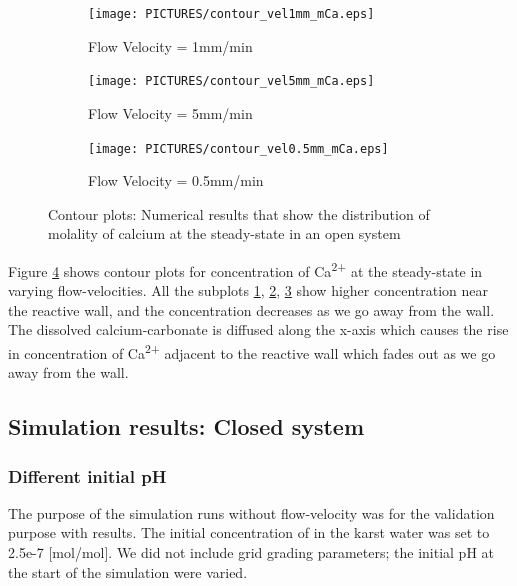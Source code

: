 \begin{figure}[!h]
\centering
    \begin{subfigure}{.5\linewidth}
        \centering
        \texttt{[image: PICTURES/contour\_vel1mm\_mCa.eps]}
        \caption{Flow Velocity = 1mm/min}
        \label{fig:CaSteady-state}       %
    \end{subfigure}%
    \hfill
    \begin{subfigure}{.5\linewidth}
        \centering
        \texttt{[image: PICTURES/contour\_vel5mm\_mCa.eps]}
        \caption{Flow Velocity = 5mm/min}
        \label{fig:CaSteady-state5mm}       %
    \end{subfigure}%
    \hfill
    \begin{subfigure}{.5\linewidth}
        \centering
        \texttt{[image: PICTURES/contour\_vel0.5mm\_mCa.eps]}
        \caption{Flow Velocity = 0.5mm/min}
        \label{fig:CaSteady-state0.5mm}       %
    \end{subfigure}%
    \caption{\DuMuX Contour plots: Numerical results that show the distribution of molality of calcium at the steady-state in an open system}
     \label{fig:contourCa}
\end{figure}

Figure \ref{fig:contourCa} shows contour plots for concentration of Ca\textsuperscript{2+} at the steady-state in varying flow-velocities. 
All the subplots \ref{fig:CaSteady-state}, \ref{fig:CaSteady-state5mm}, \ref{fig:CaSteady-state0.5mm} show higher concentration near the 
reactive wall, and the concentration decreases as we go away from the wall. The dissolved calcium-carbonate is diffused along the x-axis 
which causes the rise in concentration of Ca\textsuperscript{2+} adjacent to the reactive wall which fades out as we go away from the wall.


\subsection{\DuMuX Simulation results: Closed system}
\subsubsection*{Different initial pH} \label{ssec:diffinitialpHnoflow}
The purpose of the simulation runs without flow-velocity was for the validation purpose with \MATLAB results. The initial concentration 
of  in the karst water was set to 2.5e-7 [mol/mol]. We did not include grid grading parameters; the initial pH at the start of 
the simulation were varied.

